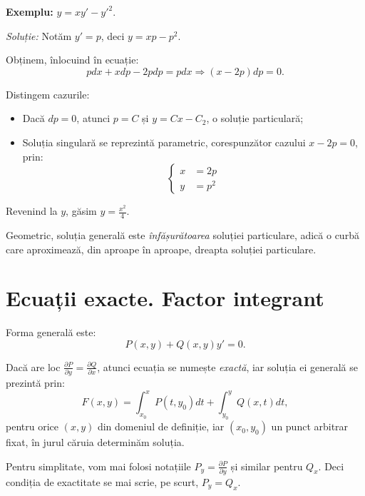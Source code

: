 \vspace{1cm}

\textbf{Exemplu:} $y = xy' - {y'}^2$.

\emph{Soluție:} Notăm $y' = p$, deci $y = xp - p^2$.

Obținem, înlocuind în ecuație:
\[
  pdx + xdp - 2pdp = pdx \Rightarrow (x - 2p) dp = 0.
\]

Distingem cazurile:
\begin{itemize}
\item Dacă $dp = 0$, atunci $p = C$ și $y = Cx - C_2$, o soluție particulară;
\item Soluția singulară se reprezintă parametric, corespunzător cazului $x - 2p = 0$, prin:
  \[
    \begin{cases}
      x &= 2p \\
      y &= p^2
    \end{cases}
  \]
\end{itemize}

Revenind la $y$, găsim $y = \frac{x^2}{4}$.

\begin{remark}\label{rk:infas}
  Geometric, soluția generală este \emph{înfășurătoarea} soluției particulare, adică o curbă
  care aproximează, din aproape în aproape, dreapta soluției particulare.
\end{remark}


\section{Ecuații exacte. Factor integrant}
\label{sec:exc-int}

Forma generală este:
\[
  P(x, y) + Q(x, y) y' = 0.
\]

Dacă are loc $\frac{\partial P}{\partial y} = \frac{\partial Q}{\partial x}$, atunci
ecuația se numește \emph{exactă}, iar soluția ei generală se prezintă prin:
\[
  F(x, y) = \int_{x_0}^x P(t, y_0) dt + \int_{y_0}^y Q(x, t) dt,
\]
pentru orice $(x, y)$ din domeniul de definiție, iar $(x_0, y_0)$ un punct arbitrar fixat,
în jurul căruia determinăm soluția.

\begin{remark}\label{rk:partial}
  Pentru simplitate, vom mai folosi notațiile $P_y = \frac{\partial P}{\partial y}$ și
  similar pentru $Q_x$. Deci condiția de exactitate se mai scrie, pe scurt, $P_y = Q_x$.
\end{remark}

